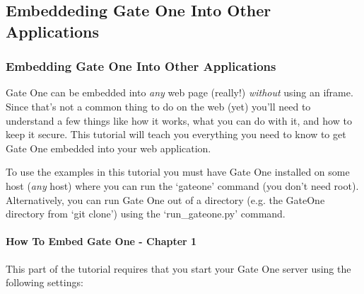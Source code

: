 \documentclass[letterpaper,10pt,openany]{sphinxmanual}
\begin{document}
\subsection{Embeddeding Gate One Into Other Applications}
\label{Developer/index:embeddeding-gate-one-into-other-applications}

\subsubsection{Embedding Gate One Into Other Applications}
\label{Developer/embedding:embedding-gate-one-into-other-applications}\label{Developer/embedding::doc}\label{Developer/embedding:gateone-embedding}
Gate One can be embedded into \emph{any} web page (really!) \emph{without} using an iframe.  Since that's not a common thing to do on the web (yet) you'll need to understand a few things like how it works, what you can do with it, and how to keep it secure.  This tutorial will teach you everything you need to know to get Gate One embedded into your web application.

To use the examples in this tutorial you must have Gate One installed on some host (\emph{any} host) where you can run the `gateone' command (you don't need root).  Alternatively, you can run Gate One out of a directory (e.g. the GateOne directory from `git clone') using the `run\_gateone.py' command.


\paragraph{How To Embed Gate One - Chapter 1}
\label{Developer/embedding_chapter1::doc}\label{Developer/embedding_chapter1:how-to-embed-gate-one-chapter-1}\label{Developer/embedding_chapter1:gateone-embedding1}
This part of the tutorial requires that you start your Gate One server using the following settings:
\end{document}
